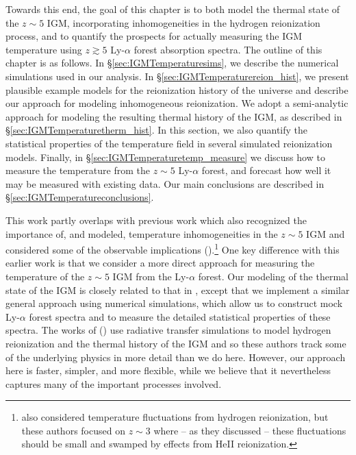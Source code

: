 Towards this end, the goal of this chapter is to both model the thermal state of the $z \sim 5$ IGM, incorporating inhomogeneities in
the hydrogen reionization process, and to quantify the prospects for actually measuring the IGM temperature using $z \gtrsim 5$ Ly-$\alpha$ forest absorption spectra. The outline of this chapter is as follows. In \S \ref{sec:IGMTemperaturesims}, we describe
the numerical simulations used in our analysis. In \S \ref{sec:IGMTemperaturereion_hist}, we present plausible example models for
the reionization history of the universe and describe our approach for modeling inhomogeneous reionization. We adopt a semi-analytic approach
for modeling the resulting thermal history of the IGM, as described in \S \ref{sec:IGMTemperaturetherm_hist}. In this section, we also quantify
the statistical properties of the temperature field in several simulated reionization models.
 Finally, in \S \ref{sec:IGMTemperaturetemp_measure} we discuss how to measure
the temperature from the $z \sim 5$ Ly-$\alpha$ forest, and forecast how well it may be measured with existing data. Our main conclusions
are described in \S \ref{sec:IGMTemperatureconclusions}.

This work partly overlaps with previous work which also recognized the importance of, and modeled, temperature inhomogeneities in the $z \sim 5$ IGM
and considered some of the observable implications (\citealt{Trac:2008yz,Cen:2009bg,Furlanetto:2009kr}).\footnote{\citet{Lai:2005ha} also considered
temperature fluctuations from hydrogen reionization, but these authors focused on $z \sim 3$ where -- as they discussed -- these fluctuations should be small and swamped
by effects from HeII reionization.} One key difference with this earlier work is
that we consider a more direct approach for measuring the temperature of the $z \sim 5$ IGM from the Ly-$\alpha$ forest. Our modeling of
the thermal state of the IGM is closely related to that in \citet{Furlanetto:2009kr}, except that we implement a similar general approach
using numerical simulations, which allow us to construct mock Ly-$\alpha$ forest spectra and to measure the detailed statistical properties
of these spectra. The works of (\citealt{Trac:2008yz,Cen:2009bg}) use radiative transfer simulations to model hydrogen reionization and the
thermal history of the IGM and so these authors track
some of the underlying physics in more detail than we do here. However, our approach here is faster, simpler, and more flexible, while we believe
that it nevertheless captures many of the important processes involved. 


